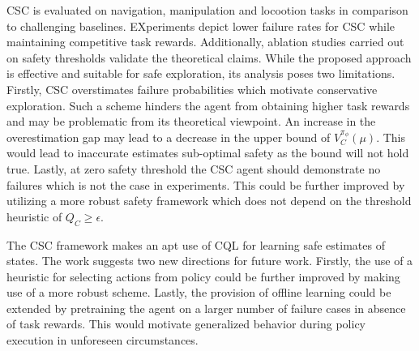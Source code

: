 \documentclass[11pt,letterpaper]{article}
\begin{document}
CSC is evaluated on navigation, manipulation and locootion tasks in comparison to challenging baselines. EXperiments depict lower failure rates for CSC while maintaining competitive task rewards. Additionally, ablation studies carried out on safety thresholds validate the theoretical claims. While the proposed approach is effective and suitable for safe exploration, its analysis poses two limitations. Firstly, CSC overstimates failure probabilities which motivate conservative exploration. Such a scheme hinders the agent from obtaining higher task rewards and may be problematic from its theoretical viewpoint. An increase in the overestimation gap may lead to a decrease in the upper bound of $V_{C}^{\pi_{\phi}}(\mu)$. This would lead to inaccurate estimates sub-optimal safety as the bound will not hold true. Lastly, at zero safety threshold the CSC agent should demonstrate no failures which is not the case in experiments. This could be further improved by utilizing a more robust safety framework which does not depend on the threshold heuristic of $Q_{C} \geq \epsilon$. 

The CSC framework makes an apt use of CQL for learning safe estimates of states. The work suggests two new directions for future work. Firstly, the use of a heuristic for selecting actions from policy could be further improved by making use of a more robust scheme. Lastly, the provision of offline learning could be extended by pretraining the agent on a larger number of failure cases in absence of task rewards. This would motivate generalized behavior during policy execution in unforeseen circumstances. 
\end{document}
